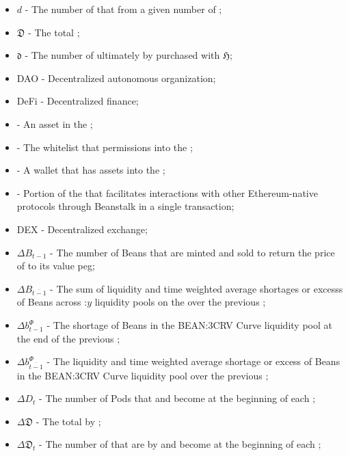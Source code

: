 \documentclass[class=article, crop=false]{standalone}
\begin{document}
\begin{itemize}[topsep=0pt, itemsep=3pt,leftmargin=16pt]
    \item[] $d$ - The number of  that  from a given number of  \Bean;
    \item[] $\mathfrak{D}$ - The total  ;
    \item[] $\mathfrak{d}$ - The number of  ultimately  by   purchased with  $\mathfrak{H}$;
    \item[] DAO - Decentralized autonomous organization;
    \item[] DeFi - Decentralized finance;
    \item[]  - An asset in the ;
    \item[]   - The whitelist that permissions  into the ;
    \item[]  - A wallet that has  assets into the ;
    \item[]  - Portion of the  that facilitates interactions with other Ethereum-native protocols through Beanstalk in a single transaction;
    \item[] DEX - Decentralized exchange;
    \item[] $\Delta B_{t-1}$ - The number of Beans that are minted and sold to return the price of  to its value peg;
    \item[] $\Delta B_{\overline{t-1}}$ - The sum of liquidity and time weighted average shortages or excesss of Beans across \Bean:$y$ liquidity pools on the   over the previous ;
    \item[] $\Delta b_{t-1}^{\Phi}$ - The shortage of Beans in the BEAN:3CRV Curve liquidity pool at the end of the previous ;
    \item[] $\Delta b_{\overline{t-1}}^{\Phi}$ - The liquidity and time weighted average shortage or excess of Beans in the BEAN:3CRV Curve liquidity pool over the previous ;
    \item[] $\Delta D_t$ - The number of Pods that  and become  at the beginning of each ;
    \item[] $\Delta \mathfrak{D}$ - The total   by ;
    \item[] $\Delta \mathfrak{D}_t$ - The number of   that are  by   and become  at the beginning of each ;

\end{itemize}
\end{document}
